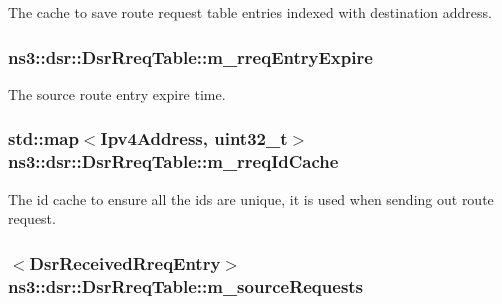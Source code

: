The cache to save route request table entries indexed with destination address. 

\subsubsection[{\texorpdfstring{m\+\_\+rreq\+Entry\+Expire}{m_rreqEntryExpire}}]{ ns3\+::dsr\+::\+Dsr\+Rreq\+Table\+::m\+\_\+rreq\+Entry\+Expire\hspace{0.3cm}{\ttfamily [private]}}\hypertarget{classns3_1_1dsr_1_1DsrRreqTable_a5c13c1df73a723cb17973459d5c54923}{}\label{classns3_1_1dsr_1_1DsrRreqTable_a5c13c1df73a723cb17973459d5c54923}


The source route entry expire time. 

\subsubsection[{\texorpdfstring{m\+\_\+rreq\+Id\+Cache}{m_rreqIdCache}}]{\setlength{\rightskip}{0pt plus 5cm}std\+::map$<${\bf Ipv4\+Address}, uint32\+\_\+t$>$ ns3\+::dsr\+::\+Dsr\+Rreq\+Table\+::m\+\_\+rreq\+Id\+Cache\hspace{0.3cm}{\ttfamily [private]}}\hypertarget{classns3_1_1dsr_1_1DsrRreqTable_a320d3d557c1ea9963868fb9d2efbe3a5}{}\label{classns3_1_1dsr_1_1DsrRreqTable_a320d3d557c1ea9963868fb9d2efbe3a5}


The id cache to ensure all the ids are unique, it is used when sending out route request. 

\subsubsection[{\texorpdfstring{m\+\_\+source\+Requests}{m_sourceRequests}}]{$<${\bf Dsr\+Received\+Rreq\+Entry}$>$ ns3\+::dsr\+::\+Dsr\+Rreq\+Table\+::m\+\_\+source\+Requests\hspace{0.3cm}{\ttfamily [private]}}\hypertarget{classns3_1_1dsr_1_1DsrRreqTable_a94a67c0dad622c5db48c7e5626addceb}{}\label{classns3_1_1dsr_1_1DsrRreqTable_a94a67c0dad622c5db48c7e5626addceb}


